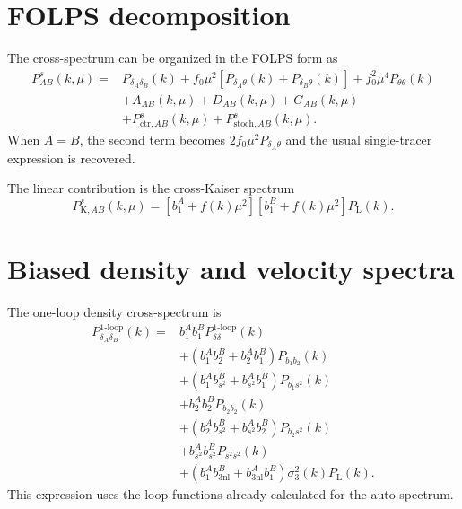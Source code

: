 \documentclass[11pt,a4paper]{article}
\newcommand{\PL}{P_{\mathrm{L}}}
\begin{document}
\section{FOLPS decomposition}
\label{sec:folps}

The cross-spectrum can be organized in the FOLPS form as
\begin{align}
    P_{AB}^s(k,\mu)
    ={}&
    P_{\delta_A\delta_B}(k)
    +f_0\mu^2
    \left[P_{\delta_A\theta}(k)+P_{\delta_B\theta}(k)\right]
    +f_0^2\mu^4P_{\theta\theta}(k)
    \nonumber\\
    &+A_{AB}(k,\mu)
    +D_{AB}(k,\mu)
    +G_{AB}(k,\mu)
    \nonumber\\
    &+P_{\mathrm{ctr},AB}^s(k,\mu)
    +P_{\mathrm{stoch},AB}^s(k,\mu).
\label{eq:cross_folps_decomposition}
\end{align}
When $A=B$, the second term becomes $2f_0\mu^2P_{\delta_A\theta}$ and the usual single-tracer expression is recovered.

The linear contribution is the cross-Kaiser spectrum
\begin{equation}
    P_{\mathrm{K},AB}^s(k,\mu)
    =
    \left[b_1^A+f(k)\mu^2\right]
    \left[b_1^B+f(k)\mu^2\right]
    \PL(k).
\label{eq:cross_kaiser}
\end{equation}

\section{Biased density and velocity spectra}
\label{sec:dv}

The one-loop density cross-spectrum is
\begin{align}
    P_{\delta_A\delta_B}^{\mathrm{1\mbox{-}loop}}(k)
    ={}&
    b_1^A b_1^B P_{\delta\delta}^{\mathrm{1\mbox{-}loop}}(k)
    \nonumber\\
    &+\left(b_1^A b_2^B+b_2^A b_1^B\right)P_{b_1b_2}(k)
    \nonumber\\
    &+\left(b_1^A b_{s^2}^B+b_{s^2}^A b_1^B\right)P_{b_1s^2}(k)
    \nonumber\\
    &+b_2^A b_2^B P_{b_2b_2}(k)
    \nonumber\\
    &+\left(b_2^A b_{s^2}^B+b_{s^2}^A b_2^B\right)P_{b_2s^2}(k)
    \nonumber\\
    &+b_{s^2}^A b_{s^2}^B P_{s^2s^2}(k)
    \nonumber\\
    &+\left(b_1^A b_{3\mathrm{nl}}^B+b_{3\mathrm{nl}}^A b_1^B\right)
    \sigma_3^2(k)\PL(k).
\label{eq:Pdd_cross}
\end{align}
This expression uses the loop functions already calculated for the auto-spectrum.
\end{document}
